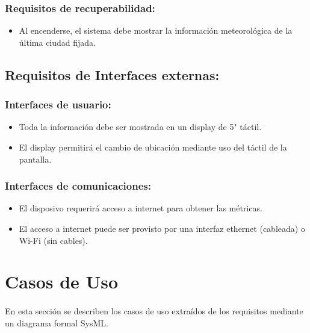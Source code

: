 \subsubsection{Requisitos de recuperabilidad:}
\begin{itemize}
    \item Al encenderse, el sistema debe mostrar la información meteorológica de la
    última ciudad fijada.
\end{itemize}

\subsection{Requisitos de Interfaces externas:}

\subsubsection{Interfaces de usuario:}
\begin{itemize}
    \item Toda la información debe ser mostrada en un display de 5" táctil.
    \item El display permitirá el cambio de ubicación mediante uso del táctil de la pantalla.
\end{itemize}

\subsubsection{Interfaces de comunicaciones:}
\begin{itemize}
    \item El disposivo requerirá acceso a internet para obtener las métricas.
    \item El acceso a internet puede ser provisto por una interfaz ethernet (cableada)
    o Wi-Fi (sin cables).
\end{itemize}

\section{Casos de Uso}

\paragraph{}En esta sección se describen los casos de uso extraídos de los requisitos
mediante un diagrama formal SysML.

